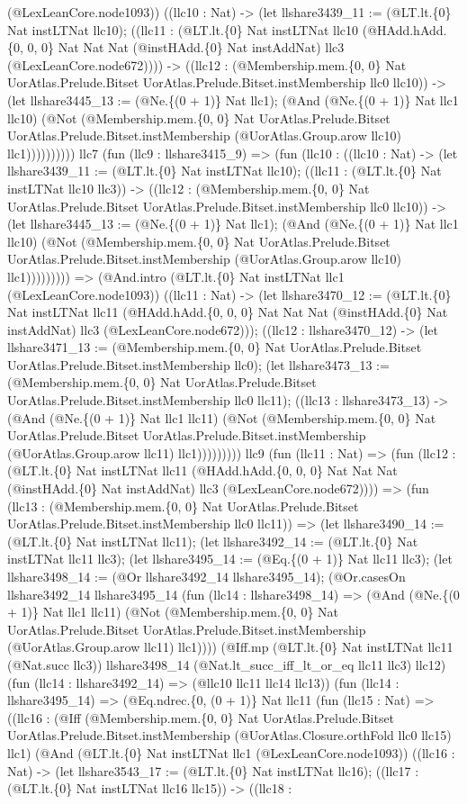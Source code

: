 \documentclass[11pt]{article}
\begin{document}
(@LexLeanCore.node1093)) ((llc10 : Nat) -> (let llshare3439\_11 := (@LT.lt.\{0\} Nat instLTNat llc10); ((llc11 : (@LT.lt.\{0\} Nat instLTNat llc10 (@HAdd.hAdd.\{0, 0, 0\} Nat Nat Nat (@instHAdd.\{0\} Nat instAddNat) llc3 (@LexLeanCore.node672)))) -> ((llc12 : (@Membership.mem.\{0, 0\} Nat UorAtlas.Prelude.Bitset UorAtlas.Prelude.Bitset.instMembership llc0 llc10)) -> (let llshare3445\_13 := (@Ne.\{(0 + 1)\} Nat llc1); (@And (@Ne.\{(0 + 1)\} Nat llc1 llc10) (@Not (@Membership.mem.\{0, 0\} Nat UorAtlas.Prelude.Bitset UorAtlas.Prelude.Bitset.instMembership (@UorAtlas.Group.arow llc10) llc1)))))))))) llc7 (fun (llc9 : llshare3415\_9) => (fun (llc10 : ((llc10 : Nat) -> (let llshare3439\_11 := (@LT.lt.\{0\} Nat instLTNat llc10); ((llc11 : (@LT.lt.\{0\} Nat instLTNat llc10 llc3)) -> ((llc12 : (@Membership.mem.\{0, 0\} Nat UorAtlas.Prelude.Bitset UorAtlas.Prelude.Bitset.instMembership llc0 llc10)) -> (let llshare3445\_13 := (@Ne.\{(0 + 1)\} Nat llc1); (@And (@Ne.\{(0 + 1)\} Nat llc1 llc10) (@Not (@Membership.mem.\{0, 0\} Nat UorAtlas.Prelude.Bitset UorAtlas.Prelude.Bitset.instMembership (@UorAtlas.Group.arow llc10) llc1))))))))) => (@And.intro (@LT.lt.\{0\} Nat instLTNat llc1 (@LexLeanCore.node1093)) ((llc11 : Nat) -> (let llshare3470\_12 := (@LT.lt.\{0\} Nat instLTNat llc11 (@HAdd.hAdd.\{0, 0, 0\} Nat Nat Nat (@instHAdd.\{0\} Nat instAddNat) llc3 (@LexLeanCore.node672))); ((llc12 : llshare3470\_12) -> (let llshare3471\_13 := (@Membership.mem.\{0, 0\} Nat UorAtlas.Prelude.Bitset UorAtlas.Prelude.Bitset.instMembership llc0); (let llshare3473\_13 := (@Membership.mem.\{0, 0\} Nat UorAtlas.Prelude.Bitset UorAtlas.Prelude.Bitset.instMembership llc0 llc11); ((llc13 : llshare3473\_13) -> (@And (@Ne.\{(0 + 1)\} Nat llc1 llc11) (@Not (@Membership.mem.\{0, 0\} Nat UorAtlas.Prelude.Bitset UorAtlas.Prelude.Bitset.instMembership (@UorAtlas.Group.arow llc11) llc1))))))))) llc9 (fun (llc11 : Nat) => (fun (llc12 : (@LT.lt.\{0\} Nat instLTNat llc11 (@HAdd.hAdd.\{0, 0, 0\} Nat Nat Nat (@instHAdd.\{0\} Nat instAddNat) llc3 (@LexLeanCore.node672)))) => (fun (llc13 : (@Membership.mem.\{0, 0\} Nat UorAtlas.Prelude.Bitset UorAtlas.Prelude.Bitset.instMembership llc0 llc11)) => (let llshare3490\_14 := (@LT.lt.\{0\} Nat instLTNat llc11); (let llshare3492\_14 := (@LT.lt.\{0\} Nat instLTNat llc11 llc3); (let llshare3495\_14 := (@Eq.\{(0 + 1)\} Nat llc11 llc3); (let llshare3498\_14 := (@Or llshare3492\_14 llshare3495\_14); (@Or.casesOn llshare3492\_14 llshare3495\_14 (fun (llc14 : llshare3498\_14) => (@And (@Ne.\{(0 + 1)\} Nat llc1 llc11) (@Not (@Membership.mem.\{0, 0\} Nat UorAtlas.Prelude.Bitset UorAtlas.Prelude.Bitset.instMembership (@UorAtlas.Group.arow llc11) llc1)))) (@Iff.mp (@LT.lt.\{0\} Nat instLTNat llc11 (@Nat.succ llc3)) llshare3498\_14 (@Nat.lt\_succ\_iff\_lt\_or\_eq llc11 llc3) llc12) (fun (llc14 : llshare3492\_14) => (@llc10 llc11 llc14 llc13)) (fun (llc14 : llshare3495\_14) => (@Eq.ndrec.\{0, (0 + 1)\} Nat llc11 (fun (llc15 : Nat) => ((llc16 : (@Iff (@Membership.mem.\{0, 0\} Nat UorAtlas.Prelude.Bitset UorAtlas.Prelude.Bitset.instMembership (@UorAtlas.Closure.orthFold llc0 llc15) llc1) (@And (@LT.lt.\{0\} Nat instLTNat llc1 (@LexLeanCore.node1093)) ((llc16 : Nat) -> (let llshare3543\_17 := (@LT.lt.\{0\} Nat instLTNat llc16); ((llc17 : (@LT.lt.\{0\} Nat instLTNat llc16 llc15)) -> ((llc18 : 
\end{document}

